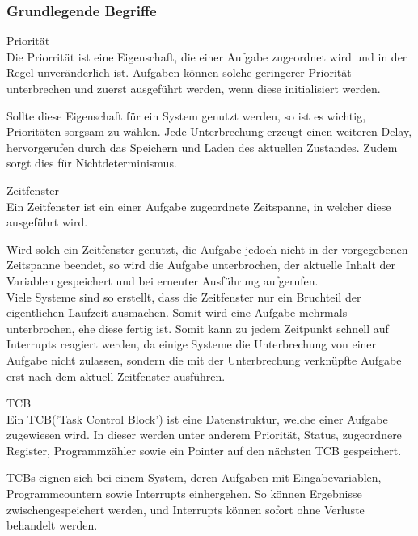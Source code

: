 \subsubsection{Grundlegende Begriffe}
\begin{definition}{Priorität}\\
Die Priorrität ist eine Eigenschaft, die einer Aufgabe zugeordnet wird und in der Regel unveränderlich ist. Aufgaben können solche geringerer Priorität unterbrechen und zuerst ausgeführt werden, wenn diese initialisiert werden.
\end{definition}
Sollte diese Eigenschaft für ein System genutzt werden, so ist es wichtig, Prioritäten sorgsam zu wählen. Jede Unterbrechung erzeugt einen weiteren Delay, hervorgerufen durch das Speichern und Laden des aktuellen Zustandes. Zudem sorgt dies für Nichtdeterminismus.
\begin{definition}{Zeitfenster}\\
Ein Zeitfenster ist ein einer Aufgabe zugeordnete Zeitspanne, in welcher diese ausgeführt wird.
\end{definition}
Wird solch ein Zeitfenster genutzt, die Aufgabe jedoch nicht in der vorgegebenen Zeitspanne beendet, so wird die Aufgabe unterbrochen, der aktuelle Inhalt der Variablen gespeichert und bei erneuter Ausführung aufgerufen.\\
Viele Systeme sind so erstellt, dass die Zeitfenster nur ein Bruchteil der eigentlichen Laufzeit ausmachen. Somit wird eine Aufgabe mehrmals unterbrochen, ehe diese fertig ist. Somit kann zu jedem Zeitpunkt schnell auf Interrupts reagiert werden, da einige Systeme die Unterbrechung von einer Aufgabe nicht zulassen, sondern die mit der Unterbrechung verknüpfte Aufgabe erst nach dem aktuell Zeitfenster ausführen.
\begin{definition}{TCB}\\
Ein TCB('Task Control Block') ist eine Datenstruktur, welche einer Aufgabe zugewiesen wird. In dieser werden unter anderem Priorität, Status, zugeordnere Register, Programmzähler sowie ein Pointer auf den nächsten TCB gespeichert.
\end{definition}
TCBs eignen sich bei einem System, deren Aufgaben mit Eingabevariablen, Programmcountern sowie Interrupts einhergehen. So können Ergebnisse zwischengespeichert werden, und Interrupts können sofort ohne Verluste behandelt werden.


